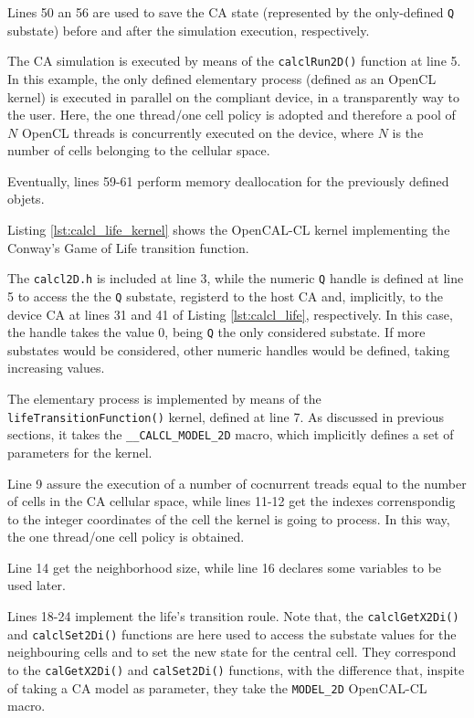 Lines 50 an 56 are used to save the CA state (represented by the
only-defined \verb'Q' substate) before and after the simulation
execution, respectively.

The CA simulation is executed by means of the \verb'calclRun2D()'
function at line 5. In this example, the only defined elementary
process (defined as an OpenCL kernel) is executed in parallel on the
compliant device, in a transparently way to the user. Here, the one
thread/one cell policy is adopted and therefore a pool of $N$ OpenCL
threads is concurrently executed on the device, where $N$ is the
number of cells belonging to the cellular space.

Eventually, lines 59-61 perform memory deallocation for the previously
defined objets.



Listing \ref{lst:calcl_life_kernel} shows the OpenCAL-CL kernel
implementing the Conway's Game of Life transition function.

The \verb'calcl2D.h' is included at line 3, while the numeric
\verb'Q' handle is defined at line 5 to access the the \verb'Q'
substate, registerd to the host CA and, implicitly, to the device CA
at lines 31 and 41 of Listing \ref{lst:calcl_life}, respectively. In
this case, the handle takes the value 0, being \verb'Q' the only
considered substate. If more substates would be considered, other
numeric handles would be defined, taking increasing values.

The elementary process is implemented by means of the
\verb'lifeTransitionFunction()' kernel, defined at line 7. As
discussed in previous sections, it takes the \verb'__CALCL_MODEL_2D'
macro, which implicitly defines a set of parameters for the kernel.

Line 9 assure the execution of a number of cocnurrent treads equal to
the number of cells in the CA cellular space, while lines 11-12 get the
indexes correnspondig to the integer coordinates of the cell the
kernel is going to process. In this way, the one thread/one cell
policy is obtained.

Line 14 get the neighborhood size, while line 16 declares some
variables to be used later.

Lines 18-24 implement the life's transition roule. Note that, the
\verb'calclGetX2Di()' and \verb'calclSet2Di()' functions are here used
to access the substate values for the neighbouring cells and to set
the new state for the central cell. They correspond to the
\verb'calGetX2Di()' and \verb'calSet2Di()' functions, with the
difference that, inspite of taking a CA model as parameter, they take
the \verb'MODEL_2D' OpenCAL-CL macro.

